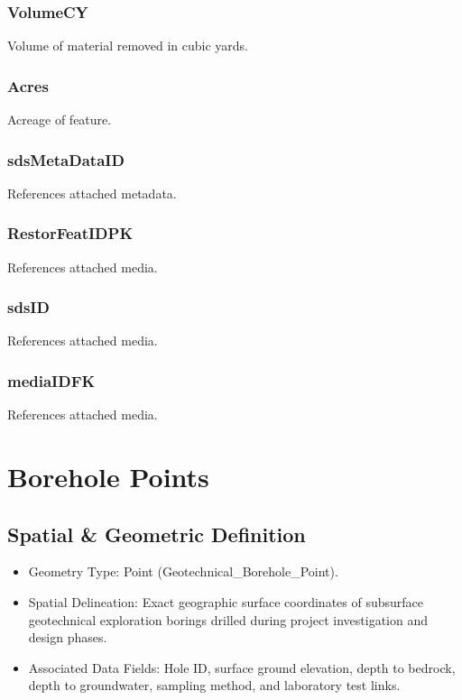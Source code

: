 \documentclass[
  letterpaper,
  DIV=11,
  numbers=noendperiod]{scrreprt}
\begin{document}
\subsection{VolumeCY}\label{volumecy-2}

Volume of material removed in cubic yards.

\subsection{Acres}\label{acres-5}

Acreage of feature.

\subsection{sdsMetaDataID}\label{sdsmetadataid-17}

References attached metadata.

\subsection{RestorFeatIDPK}\label{restorfeatidpk-17}

References attached media.

\subsection{sdsID}\label{sdsid-17}

References attached media.

\subsection{mediaIDFK}\label{mediaidfk-17}

References attached media.

\chapter{Borehole Points}\label{borehole-points}

\section{Spatial \& Geometric
Definition}\label{spatial-geometric-definition-18}

\begin{itemize}
\item
  Geometry Type: Point (Geotechnical\_Borehole\_Point).
\item
  Spatial Delineation: Exact geographic surface coordinates of
  subsurface geotechnical exploration borings drilled during project
  investigation and design phases.
\item
  Associated Data Fields: Hole ID, surface ground elevation, depth to
  bedrock, depth to groundwater, sampling method, and laboratory test
  links.
\end{itemize}
\end{document}
